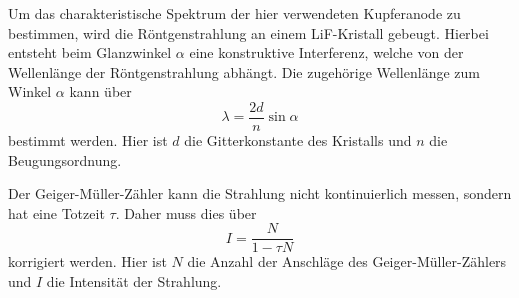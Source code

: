 Um das charakteristische Spektrum der hier verwendeten Kupferanode zu bestimmen, wird die Röntgenstrahlung an einem LiF-Kristall gebeugt.
Hierbei entsteht beim Glanzwinkel $\alpha$ eine konstruktive Interferenz, welche von der Wellenlänge der Röntgenstrahlung abhängt. 
Die zugehörige Wellenlänge zum Winkel $\alpha$ kann über 
\begin{equation}
    \lambda = \frac{2d}{n}\sin\alpha
    \label{eq:glanzwinkel}
\end{equation}
bestimmt werden. 
Hier ist $d$ die Gitterkonstante des Kristalls und $n$ die Beugungsordnung.

Der Geiger-Müller-Zähler kann die Strahlung nicht kontinuierlich messen, sondern hat eine Totzeit $\tau$.
Daher muss dies über
\begin{equation}
    I = \frac{N}{1 - \tau N}
    \label{eq:totzeit}
\end{equation}
korrigiert werden. Hier ist $N$ die Anzahl der Anschläge des Geiger-Müller-Zählers und $I$ die Intensität der Strahlung.